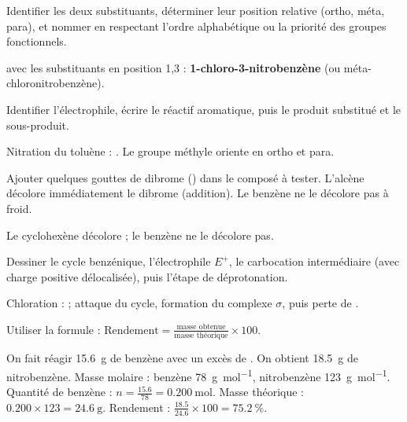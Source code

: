 Identifier les deux substituants, déterminer leur position relative (ortho, méta, para), et nommer en respectant l'ordre alphabétique ou la priorité des groupes fonctionnels.

\begin{exemple}
 avec les substituants en position 1,3 : \textbf{1-chloro-3-nitrobenzène} (ou méta-chloronitrobenzène).
\end{exemple}

Identifier l'électrophile, écrire le réactif aromatique, puis le produit substitué et le sous-produit.

\begin{exemple}
Nitration du toluène : . Le groupe méthyle oriente en ortho et para.
\end{exemple}

Ajouter quelques gouttes de dibrome () dans le composé à tester. L'alcène décolore immédiatement le dibrome (addition). Le benzène ne le décolore pas à froid.

\begin{exemple}
Le cyclohexène décolore  ; le benzène ne le décolore pas.
\end{exemple}

Dessiner le cycle benzénique, l'électrophile $E^+$, le carbocation intermédiaire (avec charge positive délocalisée), puis l'étape de déprotonation.

\begin{exemple}
Chloration :  ; attaque du cycle, formation du complexe $\sigma$, puis perte de .
\end{exemple}

Utiliser la formule : $\text{Rendement} = \frac{\text{masse obtenue}}{\text{masse théorique}} \times 100$.

\begin{exemple}
On fait réagir \SI{15.6}{\gram} de benzène avec un excès de . On obtient \SI{18.5}{\gram} de nitrobenzène. Masse molaire : benzène \SI{78}{\gram\per\mol}, nitrobenzène \SI{123}{\gram\per\mol}. Quantité de benzène : $n = \frac{15.6}{78} = \SI{0.200}{\mol}$. Masse théorique : $0.200 \times 123 = \SI{24.6}{\gram}$. Rendement : $\frac{18.5}{24.6} \times 100 = \SI{75.2}{\%}$.
\end{exemple}

